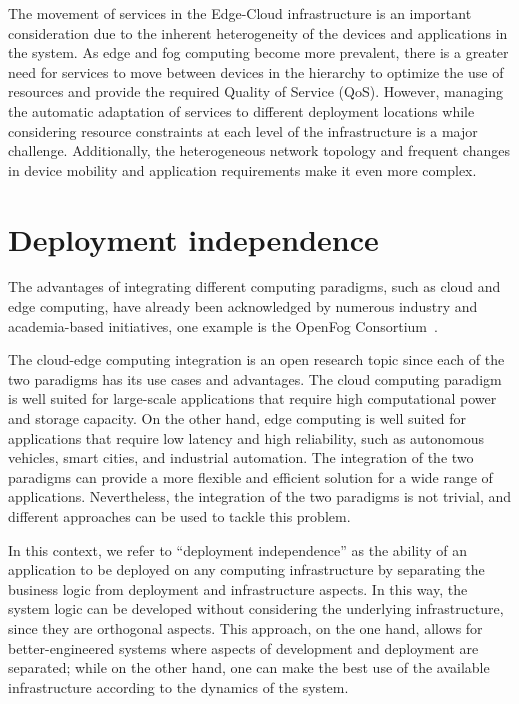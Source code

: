 The movement of services in the Edge-Cloud infrastructure is an important consideration due to the inherent heterogeneity of the devices and 
applications in the system. As edge and fog computing become more prevalent, there is a greater need for services to move between devices in the 
hierarchy to optimize the use of resources and provide the required Quality of Service (QoS). However, managing the automatic adaptation of 
services to different deployment locations while considering resource constraints at each level of the infrastructure is a major 
challenge. Additionally, the heterogeneous network topology and frequent changes in device mobility and application requirements make it even more 
complex.


\section{Deployment independence}
\label{sec:deployment-independence}

The advantages of integrating different computing paradigms, such as cloud and edge computing, have already been acknowledged by numerous
industry and academia-based initiatives, one example is the OpenFog Consortium~\cite{opc}.

The cloud-edge computing integration is an open research topic since each of the two paradigms has its use cases and advantages. The cloud
computing paradigm is well suited for large-scale applications that require high computational power and storage capacity. On the other hand, edge
computing is well suited for applications that require low latency and high reliability, such as autonomous vehicles, smart cities, and industrial
automation. The integration of the two paradigms can provide a more flexible and efficient solution for a wide range of applications.
Nevertheless, the integration of the two paradigms is not trivial, and different approaches can be used to tackle this problem.

In this context, we refer to ``deployment independence'' as the ability of an application to be deployed on any computing infrastructure by
separating the business logic from deployment and infrastructure aspects. In this way, the system logic can be developed without considering the
underlying infrastructure, since they are orthogonal aspects. This approach, on the one hand, allows for better-engineered systems where aspects of
development and deployment are separated; while on the other hand, one can make the best use of the available infrastructure according to the
dynamics of the system.

